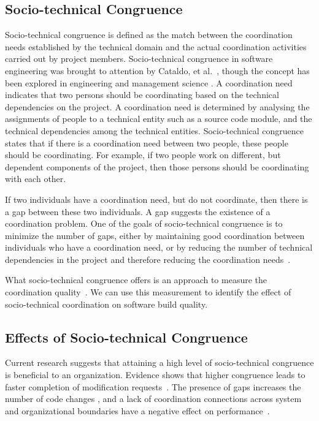 \subsection{Socio-technical Congruence}
Socio-technical congruence is defined as the match between the coordination needs established by the technical domain and the actual coordination activities carried out by project members. Socio-technical congruence in software engineering was brought to attention by Cataldo, et al.~\cite{cataldo:cscw:2006}, though the concept has been explored in engineering \cite{browning2001} and management science \cite{henderson1990}. A coordination need indicates that two persons should be coordinating based on the technical dependencies on the project. A coordination need is determined by analysing the assignments of people to a technical entity such as a source code module, and the technical dependencies among the technical entities.
Socio-technical congruence states that if there is a coordination need between two people, these people should be coordinating.
For example, if two people work on different, but dependent components of the project, then those persons should be coordinating with each other.

If two individuals have a coordination need, but do not coordinate, then there is a gap between these two individuals. A gap suggests the existence of a coordination problem. One of the goals of socio-technical congruence is to minimize the number of gaps, either by maintaining good coordination between individuals who have a coordination need, or by reducing the number of technical dependencies in the project and therefore reducing the coordination needs~\cite{sarma2008:measuring_stc}.

What socio-technical congruence offers is an approach to measure the coordination quality~\cite{cataldo:cscw:2006}. We can use this measurement to identify the effect of socio-technical coordination on software build quality.





\subsection{Effects of Socio-technical Congruence}
Current research suggests that attaining a high level of socio-technical congruence is beneficial to an organization.
Evidence shows that higher congruence leads to faster completion of modification requests~\cite{cataldo:cscw:2006}. 
The presence of gaps increases the number of code changes \cite{ehrlich:stc:2008}, and a lack of coordination connections across system and organizational boundaries have a negative effect on performance~\cite{sosa2004:manage}.

